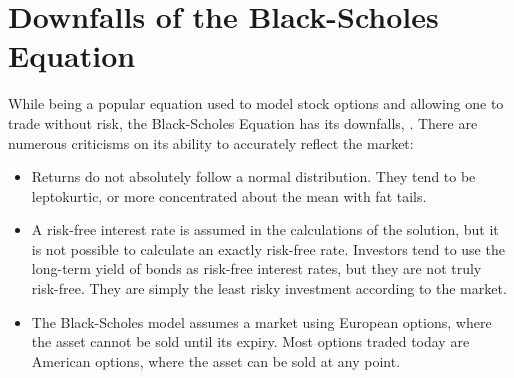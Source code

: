 \documentclass{article}
\begin{document}
\section{Downfalls of the Black-Scholes Equation}
While being a popular equation used to model stock options and allowing one to trade without risk, the Black-Scholes Equation has its downfalls, \cite{brilliant}. There are numerous criticisms on its ability to accurately reflect the market:
\begin{itemize}
\item Returns do not absolutely follow a normal distribution. They tend to be leptokurtic, or more concentrated about the mean with fat tails.
\item A risk-free interest rate is assumed in the calculations of the solution, but it is not possible to calculate an exactly risk-free rate. Investors tend to use the long-term yield of bonds as risk-free interest rates, but they are not truly risk-free. They are simply the least risky investment according to the market.
\item The Black-Scholes model assumes a market using European options, where the asset cannot be sold until its expiry. Most options traded today are American options, where the asset can be sold at any point.
\end{itemize}

\nocite{*}
\end{document}
